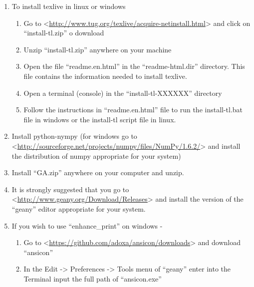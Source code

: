 \documentclass[letterpaper,10pt,english]{sphinxmanual}
\begin{document}
\begin{enumerate}
\begin{enumerate}
\begin{enumerate}
\end{enumerate}

\end{enumerate}

\item {} 
To install texlive in linux or windows
\begin{enumerate}
\item {} 
Go to \textless{}\href{http://www.tug.org/texlive/acquire-netinstall.html}{http://www.tug.org/texlive/acquire-netinstall.html}\textgreater{} and click on ``install-tl.zip'' o download

\item {} 
Unzip ``install-tl.zip'' anywhere on your machine

\item {} 
Open the file ``readme.en.html'' in the ``readme-html.dir'' directory.  This file contains the information needed to install texlive.

\item {} 
Open a terminal (console) in the ``install-tl-XXXXXX'' directory

\item {} 
Follow the instructions in ``readme.en.html'' file to run the install-tl.bat file in windows or the install-tl script file in linux.

\end{enumerate}

\item {} 
Install python-nympy (for windows go to \textless{}\href{http://sourceforge.net/projects/numpy/files/NumPy/1.6.2/}{http://sourceforge.net/projects/numpy/files/NumPy/1.6.2/}\textgreater{} and install the distribution of numpy appropriate for your system)

\item {} 
Install ``GA.zip'' anywhere on your computer and unzip.

\item {} 
It is strongly suggested that you go to \textless{}\href{http://www.geany.org/Download/Releases}{http://www.geany.org/Download/Releases}\textgreater{} and install the version of the ``geany'' editor appropriate for your system.

\item {} 
If you wish to use ``enhance\_print'' on windows -
\begin{enumerate}
\item {} 
Go to \textless{}\href{https://github.com/adoxa/ansicon/downloads}{https://github.com/adoxa/ansicon/downloads}\textgreater{} and download ``ansicon''

\item {} 
In the Edit -\textgreater{} Preferences -\textgreater{} Tools menu of ``geany'' enter into the Terminal input the full path of ``ansicon.exe''

\end{enumerate}

\end{enumerate}
\end{document}
